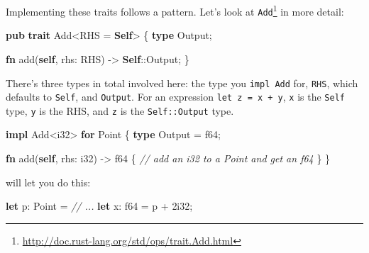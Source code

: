 \documentclass[a4paper,]{book}
\newenvironment{Shaded}{\begin{snugshade}}{\end{snugshade}}
\newcommand{\KeywordTok}[1]{\textcolor[rgb]{0.13,0.29,0.53}{\textbf{{#1}}}}
\newcommand{\DataTypeTok}[1]{\textcolor[rgb]{0.13,0.29,0.53}{{#1}}}
\newcommand{\DecValTok}[1]{\textcolor[rgb]{0.00,0.00,0.81}{{#1}}}
\newcommand{\CommentTok}[1]{\textcolor[rgb]{0.56,0.35,0.01}{\textit{{#1}}}}
\newcommand{\NormalTok}[1]{{#1}}
\renewcommand{\href}[2]{#2\footnote{\url{#1}}}
\begin{document}
Implementing these traits follows a pattern. Let's look at
\href{http://doc.rust-lang.org/std/ops/trait.Add.html}{\texttt{Add}} in
more detail:

\begin{Shaded}
\begin{Highlighting}[]
\KeywordTok{pub} \KeywordTok{trait} \NormalTok{Add<RHS = }\KeywordTok{Self}\NormalTok{> \{}
    \KeywordTok{type} \NormalTok{Output;}

    \KeywordTok{fn} \NormalTok{add(}\KeywordTok{self}\NormalTok{, rhs: RHS) -> }\KeywordTok{Self}\NormalTok{::Output;}
\NormalTok{\}}
\end{Highlighting}
\end{Shaded}

There's three types in total involved here: the type you
\texttt{impl\ Add} for, \texttt{RHS}, which defaults to \texttt{Self},
and \texttt{Output}. For an expression \texttt{let\ z\ =\ x\ +\ y},
\texttt{x} is the \texttt{Self} type, \texttt{y} is the RHS, and
\texttt{z} is the \texttt{Self::Output} type.

\begin{Shaded}
\begin{Highlighting}[]
\KeywordTok{impl} \NormalTok{Add<}\DataTypeTok{i32}\NormalTok{> }\KeywordTok{for} \NormalTok{Point \{}
    \KeywordTok{type} \NormalTok{Output = }\DataTypeTok{f64}\NormalTok{;}

    \KeywordTok{fn} \NormalTok{add(}\KeywordTok{self}\NormalTok{, rhs: }\DataTypeTok{i32}\NormalTok{) -> }\DataTypeTok{f64} \NormalTok{\{}
        \CommentTok{// add an i32 to a Point and get an f64}
    \NormalTok{\}}
\NormalTok{\}}
\end{Highlighting}
\end{Shaded}

will let you do this:

\begin{Shaded}
\begin{Highlighting}[]
\KeywordTok{let} \NormalTok{p: Point = }\CommentTok{// ...}
\KeywordTok{let} \NormalTok{x: }\DataTypeTok{f64} \NormalTok{= p + }\DecValTok{2i32}\NormalTok{;}
\end{Highlighting}
\end{Shaded}

\end{document}

